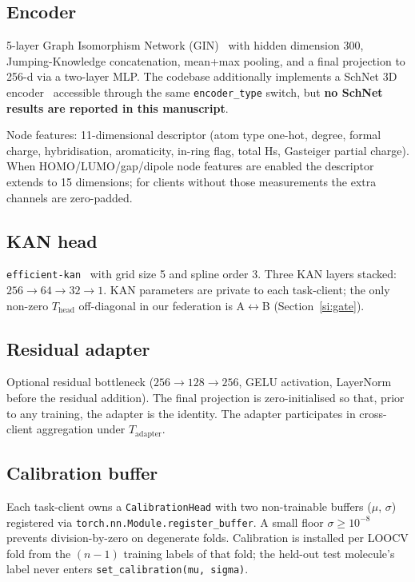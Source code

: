 \documentclass[11pt,a4paper]{article}
\begin{document}
\subsection{Encoder}
5-layer Graph Isomorphism Network (GIN)~\citep{Xu2019_GIN} with hidden dimension 300, Jumping-Knowledge concatenation, mean+max pooling, and a final projection to 256-d via a two-layer MLP. The codebase additionally implements a SchNet 3D encoder~\citep{Schutt2017_SchNet_NeurIPS} accessible through the same \texttt{encoder\_type} switch, but \textbf{no SchNet results are reported in this manuscript}.

Node features: 11-dimensional descriptor (atom type one-hot, degree, formal charge, hybridisation, aromaticity, in-ring flag, total Hs, Gasteiger partial charge). When HOMO/LUMO/gap/dipole node features are enabled the descriptor extends to 15 dimensions; for clients without those measurements the extra channels are zero-padded.

\subsection{KAN head}
\texttt{efficient-kan}~\citep{EfficientKAN2024} with grid size 5 and spline order 3. Three KAN layers stacked: $256 \to 64 \to 32 \to 1$. KAN parameters are private to each task-client; the only non-zero $T_{\mathrm{head}}$ off-diagonal in our federation is A$\leftrightarrow$B (Section~\ref{si:gate}).

\subsection{Residual adapter}
Optional residual bottleneck ($256 \to 128 \to 256$, GELU activation, LayerNorm before the residual addition). The final projection is zero-initialised so that, prior to any training, the adapter is the identity. The adapter participates in cross-client aggregation under $T_{\mathrm{adapter}}$.

\subsection{Calibration buffer}
Each task-client owns a \texttt{CalibrationHead} with two non-trainable buffers ($\mu$, $\sigma$) registered via \verb|torch.nn.Module.register_buffer|. A small floor $\sigma \ge 10^{-8}$ prevents division-by-zero on degenerate folds. Calibration is installed per LOOCV fold from the $(n - 1)$ training labels of that fold; the held-out test molecule's label never enters \verb|set_calibration(mu, sigma)|.
\end{document}
